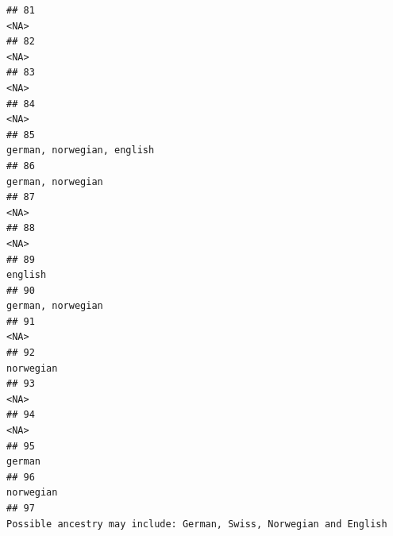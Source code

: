 \documentclass[]{article}
\begin{document}
\begin{verbatim}
## 81                                                                                                                                                 <NA>
## 82                                                                                                                                                 <NA>
## 83                                                                                                                                                 <NA>
## 84                                                                                                                                                 <NA>
## 85                                                                                                                           german, norwegian, english
## 86                                                                                                                                    german, norwegian
## 87                                                                                                                                                 <NA>
## 88                                                                                                                                                 <NA>
## 89                                                                                                                                              english
## 90                                                                                                                                    german, norwegian
## 91                                                                                                                                                 <NA>
## 92                                                                                                                                            norwegian
## 93                                                                                                                                                 <NA>
## 94                                                                                                                                                 <NA>
## 95                                                                                                                                               german
## 96                                                                                                                                            norwegian
## 97                                                                                  Possible ancestry may include: German, Swiss, Norwegian and English

\end{verbatim}
\end{document}
